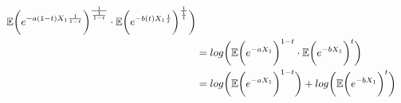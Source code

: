 \begin{align}
                                                            \E
                                                                \bigg(
                                                                    e^{-a(1-t) X_1 \frac{1}{1-t}}
                                                                \bigg)^{\frac{1}{\frac{1}{1-t}}} 
                                                        \cdot    
                                                            \E
                                                                \bigg(
                                                                    e^{-b(t) X_1 \frac{1}{t}}
                                                                \bigg)^\frac{1}{\frac{1}{t}}
                                                     \bigg)                                                                         \\
                                        &=      log\bigg( 
                                                        \E
                                                            \bigg(
                                                                e^{-a X_1}
                                                            \bigg)^{1-t} 
                                                        \cdot                                                             
                                                        \E
                                                            \bigg(
                                                                e^{-b X_1}
                                                            \bigg)^{t}
                                                     \bigg)                                                                         \\
                                        &=      log\bigg( 
                                                        \E
                                                            \bigg(
                                                                e^{-a X_1}
                                                            \bigg)^{1-t} 
                                                \bigg)
                                                        + 
                                                log\bigg(
                                                        \E
                                                            \bigg(
                                                                e^{-b X_1}
                                                            \bigg)^{t}
                                                \bigg)                                                                              \\

\end{align}
